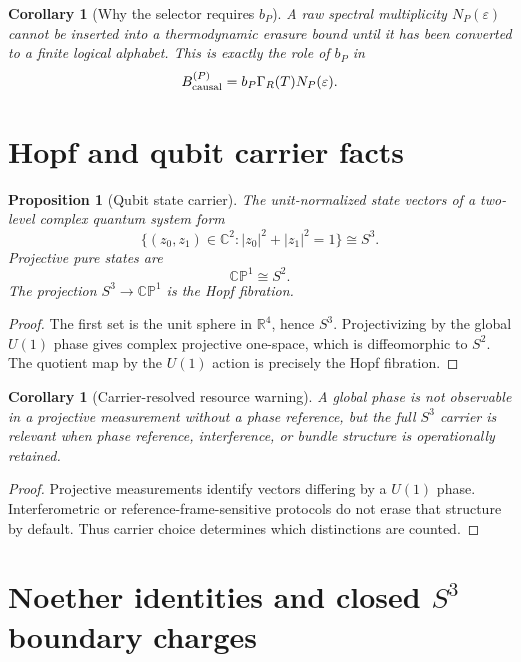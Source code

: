 \documentclass[11pt,a4paper]{article}
\newtheorem{proposition}[theorem]{Proposition}
\newtheorem{corollary}[theorem]{Corollary}
\begin{document}
\begin{corollary}[Why the selector requires $b_P$]
A raw spectral multiplicity $N_P(\varepsilon)$ cannot be inserted into a thermodynamic erasure bound until it has been converted to a finite logical alphabet.  This is exactly the role of $b_P$ in
\[
B_{\rm causal}^{(P)}=b_P\Gamma_R(T)N_P(\varepsilon).
\]
\end{corollary}

\section{Hopf and qubit carrier facts}

\begin{proposition}[Qubit state carrier]
The unit-normalized state vectors of a two-level complex quantum system form
\[
\{(z_0,z_1)\in\mathbb C^2: |z_0|^2+|z_1|^2=1\}\cong S^3.
\]
Projective pure states are
\[
\mathbb{CP}^1\cong S^2.
\]
The projection $S^3\to\mathbb{CP}^1$ is the Hopf fibration.
\end{proposition}
\begin{proof}
The first set is the unit sphere in $\mathbb R^4$, hence $S^3$.  Projectivizing by the global $U(1)$ phase gives complex projective one-space, which is diffeomorphic to $S^2$.  The quotient map by the $U(1)$ action is precisely the Hopf fibration.\end{proof}

\begin{corollary}[Carrier-resolved resource warning]
A global phase is not observable in a projective measurement without a phase reference, but the full $S^3$ carrier is relevant when phase reference, interference, or bundle structure is operationally retained.
\end{corollary}
\begin{proof}
Projective measurements identify vectors differing by a $U(1)$ phase.  Interferometric or reference-frame-sensitive protocols do not erase that structure by default.  Thus carrier choice determines which distinctions are counted.\end{proof}

\section{Noether identities and closed $S^3$ boundary charges}
\end{document}
